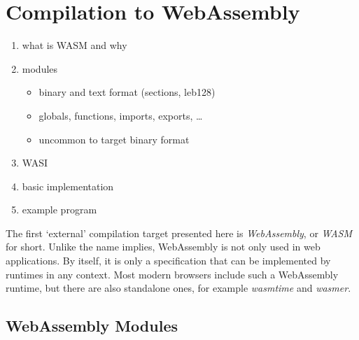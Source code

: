 \section{Compilation to WebAssembly}

\begin{enumerate}
	\item what is WASM and why
	\item modules
	      \begin{itemize}
		      \item binary and text format (sections, leb128)
		      \item globals, functions, imports, exports, \ldots
		      \item uncommon to target binary format
	      \end{itemize}
	\item WASI
	\item basic implementation
	\item example program
\end{enumerate}

The first `external' compilation target presented here is \emph{WebAssembly}, or \emph{WASM} for short.
Unlike the name implies, WebAssembly is not only used in web applications.
By itself, it is only a specification that can be implemented by runtimes in any context.
Most modern browsers include such a WebAssembly runtime, but there are also standalone ones, for example \emph{wasmtime} and \emph{wasmer}.

\subsection{WebAssembly Modules}

